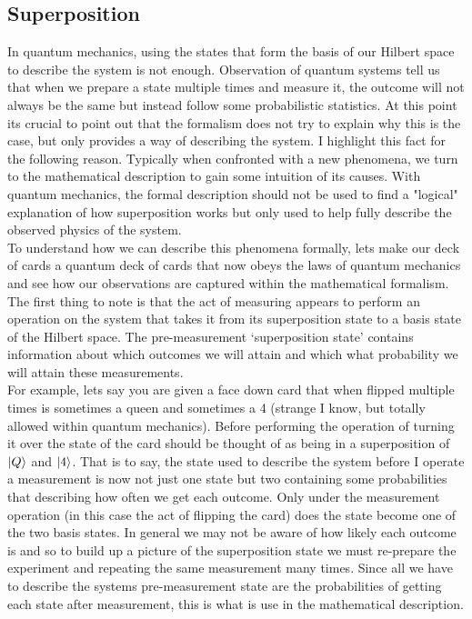 \subsection{Superposition}

In quantum mechanics, using the states that form the basis of our Hilbert space to describe the system is not enough. Observation of quantum systems tell us that when we prepare a state multiple times and measure it, the outcome will not always be the same but instead follow some probabilistic statistics. At this point its crucial to point out that the formalism does not try to explain why this is the case, but only provides a way of describing the system. I highlight this fact for the following reason. Typically when confronted with a new phenomena, we turn to the mathematical description to gain some intuition of its causes. With quantum mechanics, the formal description should not be used to find a "logical" explanation of how superposition works but only used to help fully describe the observed physics of the system.\\

To understand how we can describe this phenomena formally, lets make our deck of cards a quantum deck of cards that now obeys the laws of quantum mechanics and see how our observations are captured within the mathematical formalism.\\

The first thing to note is that the act of measuring appears to perform an operation on the system that takes it from its superposition state to a basis state of the Hilbert space. The pre-measurement `superposition state' contains information about which outcomes we will attain and which what probability we will attain these measurements.\\

For example, lets say you are given a face down card that when flipped multiple times is sometimes a queen and sometimes a 4 (strange I know, but totally allowed within quantum mechanics). Before performing the operation of turning it over the state of the card should be thought of as being in a superposition of $\left\vert{Q}\right\rangle$ and $\left\vert{4}\right\rangle$. That is to say, the state used to describe the system before I operate a measurement is now not just one state but two containing some probabilities that describing how often we get each outcome. Only under the measurement operation (in this case the act of flipping the card) does the state become one of the two basis states. In general we may not be aware of how likely each outcome is and so to build up a picture of the superposition state we must re-prepare the experiment and repeating the same measurement many times. Since all we have to describe the systems pre-measurement state are the probabilities of getting each state after measurement, this is what is use in the mathematical description.\\

